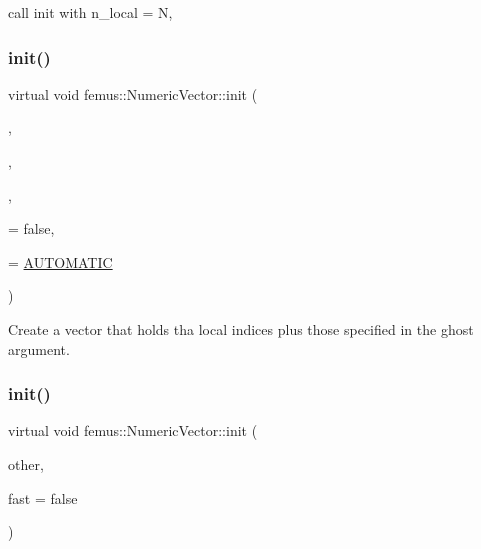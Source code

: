 call init with n\+\_\+local = N, \mbox{\label{classfemus_1_1_numeric_vector_af615f6d94b46ac802b4c2434177154ac}} 
\subsubsection{\texorpdfstring{init()}{init()}\hspace{0.1cm}{\footnotesize\ttfamily [3/4]}}
{\footnotesize\ttfamily virtual void femus\+::\+Numeric\+Vector\+::init (\begin{DoxyParamCaption}\item[{const int}]{,  }\item[{const int}]{,  }\item[{const std\+::vector$<$ int $>$ \&}]{,  }\item[{const bool}]{ = {\ttfamily false},  }\item[{const \mbox{\hyperlink{_paralleltype_enum_8hpp_a55f694af2ca20b6481914237cf7e567c}{Parallel\+Type}}}]{ = {\ttfamily \mbox{\hyperlink{_paralleltype_enum_8hpp_a55f694af2ca20b6481914237cf7e567ca0a831c2bc18e8354fe3e30ec0f3cdcda}{A\+U\+T\+O\+M\+A\+T\+IC}}} }\end{DoxyParamCaption})\hspace{0.3cm}{\ttfamily [pure virtual]}}

Create a vector that holds tha local indices plus those specified in the {\ttfamily ghost} argument. \mbox{\label{classfemus_1_1_numeric_vector_a5e855a5b6050845459cd81c721e088dd}} 
\subsubsection{\texorpdfstring{init()}{init()}\hspace{0.1cm}{\footnotesize\ttfamily [4/4]}}
{\footnotesize\ttfamily virtual void femus\+::\+Numeric\+Vector\+::init (\begin{DoxyParamCaption}\item[{const \mbox{\hyperlink{classfemus_1_1_numeric_vector}{Numeric\+Vector}} \&}]{other,  }\item[{const bool}]{fast = {\ttfamily false} }\end{DoxyParamCaption})\hspace{0.3cm}{\ttfamily [pure virtual]}}

